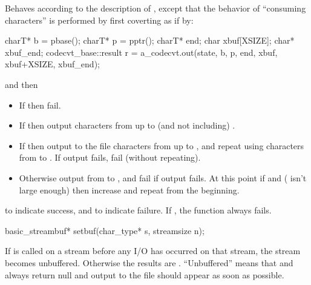 \begin{itemdescr}
\pnum
\effects
Behaves according to the description of
,
except that the behavior of ``consuming characters'' is performed by first
coverting as if by:

\begin{codeblock}
charT* b = pbase();
charT* p = pptr();
charT* end;
char   xbuf[XSIZE];
char*  xbuf_end;
codecvt_base::result r =
  a_codecvt.out(state, b, p, end, xbuf, xbuf+XSIZE, xbuf_end);
\end{codeblock}

and then
\begin{itemize}
\item If  then fail.
\item If  then output characters from
 up to (and not including) .
\item If  then output to the file characters from
 up to , and repeat using characters from
 to . If output fails, fail (without repeating).
\item Otherwise output from  to , and fail if output fails.
At this point if  and  ( isn't large
enough) then increase  and repeat from the beginning.
\end{itemize}

\pnum
\returns
{}
to indicate success, and
to indicate failure.
If
,
the function always fails.
\end{itemdescr}

%
\begin{itemdecl}
basic_streambuf* setbuf(char_type* s, streamsize n);
\end{itemdecl}

\begin{itemdescr}
\pnum
\effects
If
is called on a stream before any I/O has occurred on that stream, the
stream becomes unbuffered.
Otherwise the results are .
``Unbuffered'' means that
and
always return null
and output to the file should appear as soon as possible.
\end{itemdescr}

